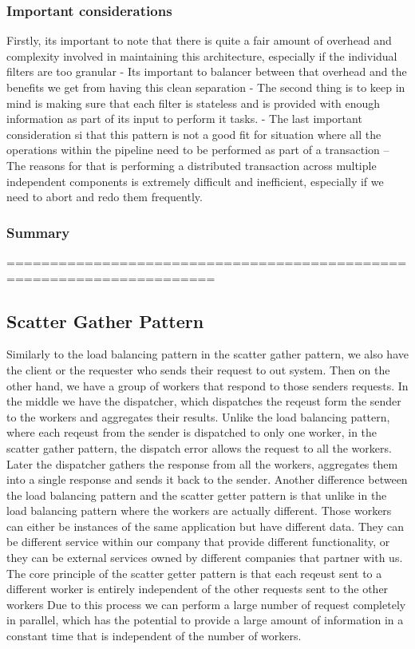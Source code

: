 \subsubsection{Important considerations}
Firstly, its important to note that there is quite a fair amount of overhead and complexity involved in maintaining this architecture, especially if the individual filters are too granular
- Its important to balancer between that overhead and the benefits we get from having this clean separation
- The second thing is to keep in mind is making sure that each filter is stateless and is provided with enough information as part of its input to perform it tasks.
- The last important consideration si that this pattern is not a good fit for situation where all the operations within the pipeline need to be performed as part of a transaction
-- The reasons for that is performing a distributed transaction across multiple independent components is extremely difficult and inefficient, especially if we need to abort and redo them frequently.

\subsubsection{Summary}
======================================================================

\subsection{Scatter Gather Pattern}

Similarly to the load balancing pattern in the scatter gather pattern, we also have the client or the requester who sends their request to out system.
Then on the other hand, we have a group of workers that respond to those senders requests.
In the middle we have the dispatcher, which dispatches the reqeust form the sender to the workers and aggregates their results.
Unlike the load balancing pattern, where each reqeust from the sender is dispatched to only one worker, in the scatter gather pattern, the dispatch error allows the request to all the workers.
Later the dispatcher gathers the response from all the workers, aggregates them into a single response and sends it back to the sender.
Another difference between the load balancing pattern and the scatter getter pattern is that unlike in the load balancing pattern where the workers are actually different.
Those workers can either be instances of the same application but have different data.
They can be different service within our company that provide different functionality, or they can be external services owned by different companies that partner with us.
The core principle of the scatter getter pattern is that each reqeust sent to a different worker is entirely independent of the other requests sent to the other workers
Due to this process we can perform a large number of request completely in parallel, which has the potential to provide a large amount of information in a constant time that is independent of the number of workers.

